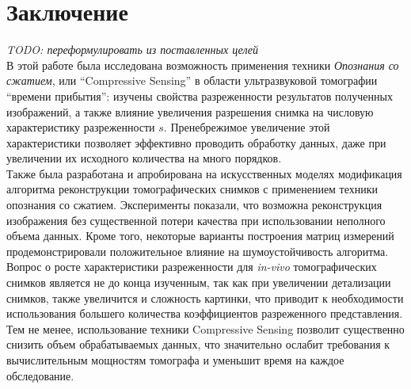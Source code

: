 \documentclass[14pt]{matmex-diploma}
\begin{document}
\section{Заключение} \label{sec:concluding}
\textit{TODO: переформулировать из поставленных целей}\\
В этой работе была исследована возможность применения техники \textit{Опознания со сжатием}, или ``Compressive Sensing'' в области ультразвуковой томографии ``времени прибытия'': изучены свойства разреженности результатов полученных изображений, а также влияние увеличения разрешения снимка на числовую характеристику разреженности $s$. Пренебрежимое увеличение этой характеристики позволяет эффективно проводить обработку данных, даже при увеличении их исходного количества на много порядков. \\

Также была разработана и апробирована на искусственных моделях модификация алгоритма реконструкции томографических снимков с применением техники опознания со сжатием. Эксперименты показали, что возможна реконструкция изображения без существенной потери качества при использовании неполного объема данных. Кроме того, некоторые варианты построения матриц измерений продемонстрировали положительное влияние на шумоустойчивость алгоритма.
Вопрос о росте характеристики разреженности для \textit{in-vivo} томографических снимков является не до конца изученным, так как при увеличении детализации снимков, также увеличится и сложность картинки, что приводит к необходимости использования большего количества коэффициентов разреженного представления. Тем не менее, использование техники Compressive Sensing позволит существенно снизить объем обрабатываемых данных, что значительно ослабит требования к вычислительным мощностям томографа и уменьшит время на каждое обследование.






\setmonofont[Mapping=tex-text]{CMU Typewriter Text}


\end{document}
